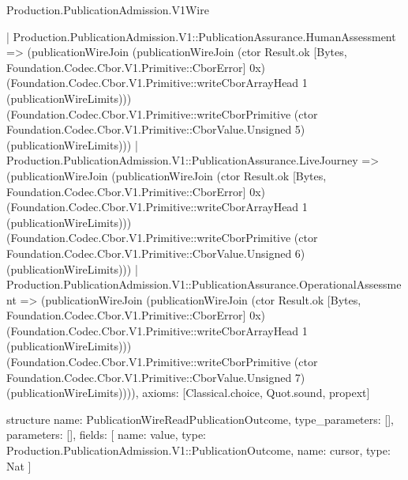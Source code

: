 \begin{lexlean}{Production.PublicationAdmission.V1Wire}
\begin{semanticmodule}
{    | Production.PublicationAdmission.V1::PublicationAssurance.HumanAssessment => (publicationWireJoin (publicationWireJoin (ctor Result.ok [Bytes, Foundation.Codec.Cbor.V1.Primitive::CborError] 0x) (Foundation.Codec.Cbor.V1.Primitive::writeCborArrayHead 1 (publicationWireLimits))) (Foundation.Codec.Cbor.V1.Primitive::writeCborPrimitive (ctor Foundation.Codec.Cbor.V1.Primitive::CborValue.Unsigned 5) (publicationWireLimits)))
    | Production.PublicationAdmission.V1::PublicationAssurance.LiveJourney => (publicationWireJoin (publicationWireJoin (ctor Result.ok [Bytes, Foundation.Codec.Cbor.V1.Primitive::CborError] 0x) (Foundation.Codec.Cbor.V1.Primitive::writeCborArrayHead 1 (publicationWireLimits))) (Foundation.Codec.Cbor.V1.Primitive::writeCborPrimitive (ctor Foundation.Codec.Cbor.V1.Primitive::CborValue.Unsigned 6) (publicationWireLimits)))
    | Production.PublicationAdmission.V1::PublicationAssurance.OperationalAssessment => (publicationWireJoin (publicationWireJoin (ctor Result.ok [Bytes, Foundation.Codec.Cbor.V1.Primitive::CborError] 0x) (Foundation.Codec.Cbor.V1.Primitive::writeCborArrayHead 1 (publicationWireLimits))) (Foundation.Codec.Cbor.V1.Primitive::writeCborPrimitive (ctor Foundation.Codec.Cbor.V1.Primitive::CborValue.Unsigned 7) (publicationWireLimits)))),
  axioms: [Classical.choice, Quot.sound, propext]
}

structure{
  name: PublicationWireReadPublicationOutcome,
  type_parameters: [],
  parameters: [],
  fields: [
    {name: value, type: Production.PublicationAdmission.V1::PublicationOutcome},
    {name: cursor, type: Nat}
  ]
}


\end{semanticmodule}
\end{lexlean}
